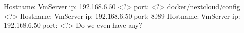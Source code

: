 \markdownRendererInterblockSeparator
{}\markdownRendererInterblockSeparator
{}\markdownRendererBlockQuoteBegin
Hostname: VmServer ip: 192.168.6.50 <?> port: <?>
\markdownRendererBlockQuoteEnd \markdownRendererInterblockSeparator
{}\markdownRendererInterblockSeparator
{}docker/nextcloud/config <?>\markdownRendererInterblockSeparator
{}\markdownRendererInterblockSeparator
{}\markdownRendererBlockQuoteBegin
Hostname: VmServer ip: 192.168.6.50 port: 8089 
\markdownRendererBlockQuoteEnd \markdownRendererInterblockSeparator
{}\markdownRendererInterblockSeparator
{}\markdownRendererBlockQuoteBegin
Hostname: VmServer ip: 192.168.6.50 port: <?>
\markdownRendererBlockQuoteEnd \markdownRendererInterblockSeparator
{}\markdownRendererInterblockSeparator
{}Do we even have any?\relax